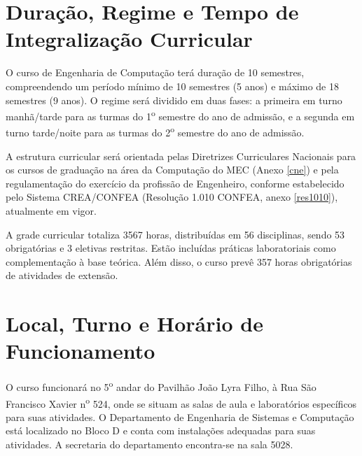 \section{Duração, Regime e Tempo de Integralização Curricular}

O curso de Engenharia de Computação terá duração de 10 semestres, compreendendo um período mínimo de 10 semestres (5 anos) e máximo de 18 semestres (9 anos). O regime será dividido em duas fases: a primeira em turno manhã/tarde para as turmas do 1\textsuperscript{o} semestre do ano de admissão, e a segunda em turno tarde/noite para as turmas do 2\textsuperscript{o} semestre do ano de admissão.

A estrutura curricular será orientada pelas Diretrizes Curriculares Nacionais para os
cursos de graduação na área da Computação do MEC (Anexo \ref{cne}) e pela regulamentação do exercício da profissão de Engenheiro, conforme estabelecido pelo Sistema CREA/CONFEA (Resolução 1.010 CONFEA, anexo \ref{res1010}), atualmente em vigor.

A grade curricular totaliza 3567 horas, distribuídas em 56 disciplinas, sendo 53 obrigatórias e 3 eletivas restritas. Estão incluídas práticas laboratoriais como complementação à base teórica. Além disso, o curso prevê 357 horas obrigatórias de atividades de extensão.
  


\section{Local, Turno e Horário de Funcionamento}

O curso funcionará no 5\textsuperscript{o} andar do Pavilhão João Lyra Filho, à Rua São Francisco Xavier n\textsuperscript{o} 524, onde se situam as salas de aula e laboratórios específicos para suas atividades. O Departamento de Engenharia de Sistemas e Computação está localizado no Bloco D e conta com instalações adequadas para suas atividades. A secretaria do departamento encontra-se na sala 5028.


